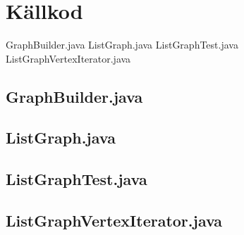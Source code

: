 \documentclass[a4paper,10pt,twoside]{article}
\begin{document}
\section{Källkod}

GraphBuilder.java
ListGraph.java
ListGraphTest.java
ListGraphVertexIterator.java


\subsection{GraphBuilder.java}
%

\subsection{ListGraph.java}
%

\subsection{ListGraphTest.java}
%

\subsection{ListGraphVertexIterator.java}
%

\end{document}
